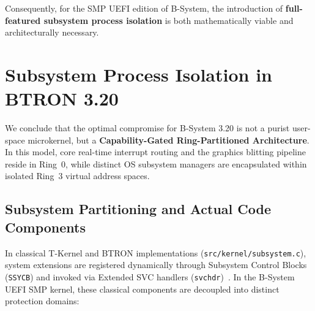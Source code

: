 \documentclass[10pt,journal,compsoc,twocolumn]{article}
\begin{document}
Consequently, for the SMP UEFI edition of B-System, the introduction of \textbf{full-featured subsystem process isolation} is both mathematically viable and architecturally necessary.

\section{Subsystem Process Isolation in BTRON 3.20}
\label{sec:isolation_plan}

We conclude that the optimal compromise for B-System 3.20 is not a purist user-space microkernel, but a \textbf{Capability-Gated Ring-Partitioned Architecture}. In this model, core real-time interrupt routing and the graphics blitting pipeline reside in Ring~0, while distinct OS subsystem managers are encapsulated within isolated Ring~3 virtual address spaces.

\subsection{Subsystem Partitioning and Actual Code Components}
In classical T-Kernel and BTRON implementations (\texttt{src/kernel/subsystem.c}), system extensions are registered dynamically through Subsystem Control Blocks (\texttt{SSYCB}) and invoked via Extended SVC handlers (\texttt{svchdr})~\cite{btron3spec}. In the B-System UEFI SMP kernel, these classical components are decoupled into distinct protection domains:
\end{document}
